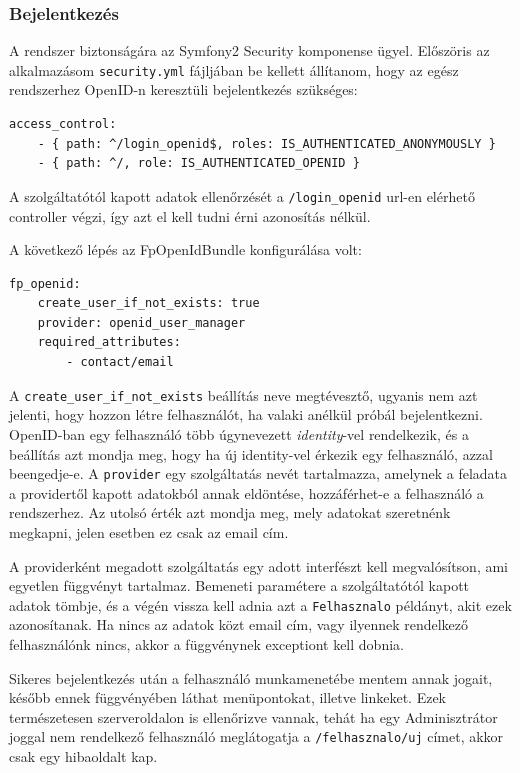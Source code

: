 \documentclass[a4paper,12pt,oneside]{report}
\begin{document}
\subsubsection*{Bejelentkezés}

A rendszer biztonságára az Symfony2 Security komponense ügyel. Előszöris az alkalmazásom {\tt security.yml} fájljában be kellett állítanom, hogy az egész rendszerhez OpenID-n keresztüli bejelentkezés szükséges:

\begin{lstlisting}
access_control:
    - { path: ^/login_openid$, roles: IS_AUTHENTICATED_ANONYMOUSLY }
    - { path: ^/, role: IS_AUTHENTICATED_OPENID }
\end{lstlisting}

A szolgáltatótól kapott adatok ellenőrzését a {\tt /login\_openid} url-en elérhető controller végzi, így azt el kell tudni érni azonosítás nélkül.

A következő lépés az FpOpenIdBundle konfigurálása volt:

\begin{lstlisting}
fp_openid:
    create_user_if_not_exists: true
    provider: openid_user_manager
    required_attributes:
        - contact/email
\end{lstlisting}

A {\tt create\_user\_if\_not\_exists} beállítás neve megtévesztő, ugyanis nem azt jelenti, hogy hozzon létre felhasználót, ha valaki anélkül próbál bejelentkezni. OpenID-ban egy felhasználó több úgynevezett {\em identity}-vel rendelkezik, és a beállítás azt mondja meg, hogy ha új identity-vel érkezik egy felhasználó, azzal beengedje-e. A {\tt provider} egy szolgáltatás nevét tartalmazza, amelynek a feladata a providertől kapott adatokból annak eldöntése, hozzáférhet-e a felhasználó a rendszerhez. Az utolsó érték azt mondja meg, mely adatokat szeretnénk megkapni, jelen esetben ez csak az email cím.

A providerként megadott szolgáltatás egy adott interfészt kell megvalósítson, ami egyetlen függvényt tartalmaz. Bemeneti paramétere a szolgáltatótól kapott adatok tömbje, és a végén vissza kell adnia azt a {\tt Felhasznalo} példányt, akit ezek azonosítanak. Ha nincs az adatok közt email cím, vagy ilyennek rendelkező felhasználónk nincs, akkor a függvénynek exceptiont kell dobnia.


Sikeres bejelentkezés után a felhasználó munkamenetébe mentem annak jogait, később ennek függvényében láthat menüpontokat, illetve linkeket. Ezek természetesen szerveroldalon is ellenőrizve vannak, tehát ha egy Adminisztrátor joggal nem rendelkező felhasználó meglátogatja a {\tt /felhasznalo/uj} címet, akkor csak egy hibaoldalt kap.
\end{document}
